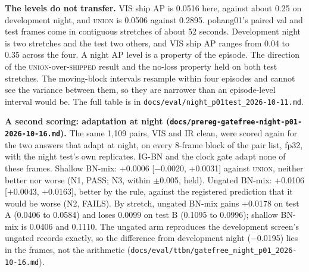 \documentclass[10pt]{article}
\begin{document}
\textbf{The levels do not transfer.} VIS ship AP is 0.0516 here, against about 0.25 on development night, and \textsc{union} is 0.0506 against 0.2895. pohang01's paired val and test frames come in contiguous stretches of about 52 seconds. Development night is two stretches and the test two others, and VIS ship AP ranges from 0.04 to 0.35 across the four. A night AP level is a property of the episode. The direction of the \textsc{union}-over-\textsc{shipped} result and the no-loss property held on both test stretches. The moving-block intervals resample within four episodes and cannot see the variance between them, so they are narrower than an episode-level interval would be. The full table is in \texttt{docs/\allowbreak{}eval/\allowbreak{}night\_\allowbreak{}p01test\_\allowbreak{}2026-10-11.md}.

\textbf{A second scoring: adaptation at night (\texttt{docs/\allowbreak{}prereg-gatefree-night-p01-2026-10-16.md}).} The same 1,109 pairs, VIS and IR clean, were scored again for the two answers that adapt at night, on every 8-frame block of the pair list, fp32, with the night test's own replicates. IG-BN and the clock gate adapt none of these frames. Shallow BN-mix: +0.0006 [$-$0.0020, +0.0031] against \textsc{union}, neither better nor worse (N1, PASS; N3, within $\pm$0.005, held). Ungated BN-mix: +0.0106 [+0.0043, +0.0163], better by the rule, against the registered prediction that it would be worse (N2, FAILS). By stretch, ungated BN-mix gains +0.0178 on test A (0.0406 to 0.0584) and loses 0.0099 on test B (0.1095 to 0.0996); shallow BN-mix is 0.0406 and 0.1110. The ungated arm reproduces the development screen's ungated records exactly, so the difference from development night ($-$0.0195) lies in the frames, not the arithmetic (\texttt{docs/\allowbreak{}eval/\allowbreak{}ttbn/\allowbreak{}gatefree\_\allowbreak{}night\_\allowbreak{}p01\_\allowbreak{}2026-10-16.md}).
\end{document}
